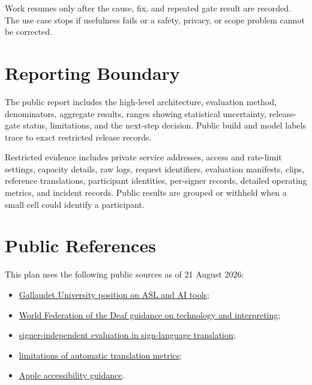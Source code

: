 \documentclass[11pt]{article}
\begin{document}
Work resumes only after the cause, fix, and repeated gate result are recorded. The use
case stops if usefulness fails or a safety, privacy, or scope problem cannot be
corrected.

\section{Reporting Boundary}

The public report includes the high-level architecture, evaluation method,
denominators, aggregate results, ranges showing statistical uncertainty, release-gate
status, limitations, and the next-step decision. Public build and model labels trace
to exact restricted release records.

Restricted evidence includes private service addresses, access and rate-limit
settings, capacity details, raw logs, request identifiers, evaluation manifests,
clips, reference translations, participant identities, per-signer records, detailed
operating metrics, and incident records. Public results are grouped or withheld when
a small cell could identify a participant.

\section{Public References}

This plan uses the following public sources as of 21 August 2026:

\begin{itemize}[nosep]
  \item \href{https://gallaudet.edu/linguistics/position-statements/asl-and-ai-tools/}{Gallaudet University position on ASL and AI tools};
  \item \href{https://wfdeaf.org/resources/consultation-on-good-practices-of-support-systems-enabling-community-inclusion-of-persons-with-disabilities/}{World Federation of the Deaf guidance on technology and interpreting};
  \item \href{https://aclanthology.org/2025.findings-emnlp.997/}{signer-independent evaluation in sign-language translation};
  \item \href{https://aclanthology.org/2026.lrec-1.749/}{limitations of automatic translation metrics};
  \item \href{https://developer.apple.com/accessibility/}{Apple accessibility guidance}.
\end{itemize}

\appendix
\small
\setlength{\parskip}{2pt plus 1pt minus 1pt}
\end{document}
